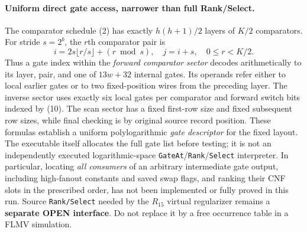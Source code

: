 \documentclass[11pt]{article}
\begin{document}
\paragraph{Uniform direct gate access, narrower than full Rank/Select.}
The comparator schedule (2) has exactly $h(h+1)/2$ layers of $K/2$
comparators. For stride $s=2^b$, the $r$th comparator pair is
\[
 i=2s\lfloor r/s\rfloor+(r\bmod s),\quad j=i+s,
 \quad0\le r<K/2.\tag{10}
\]
Thus a gate index within the \emph{forward comparator sector} decodes
arithmetically to its layer, pair, and one of $13w+32$ internal gates.
Its operands refer either to local earlier gates or to two fixed-position
wires from the preceding layer. The inverse sector uses exactly six
local gates per comparator and forward switch bits indexed by (10).
The scan sector has a fixed first-row size and fixed subsequent row
sizes, while final checking is by original source record position.
These formulas establish a uniform polylogarithmic \emph{gate descriptor}
for the fixed layout. The executable itself allocates the full gate
list before testing; it is not an independently executed logarithmic-space
\texttt{GateAt}/\texttt{Rank}/\texttt{Select} interpreter. In particular,
locating \emph{all consumers} of an arbitrary intermediate gate output,
including high-fanout constants and saved swap flags, and ranking their
CNF slots in the prescribed order, has not been implemented or fully
proved in this run. Source \texttt{Rank/Select} needed by the $R_{15}$
virtual regularizer remains a \textbf{separate OPEN interface}. Do not
replace it by a free occurrence table in a FLMV simulation.
\end{document}

